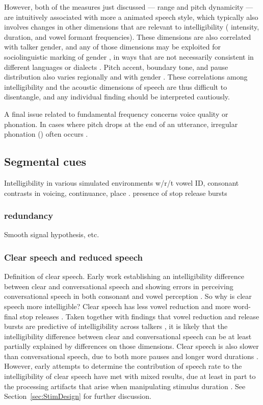 However, both of the measures just discussed — \fo{} range and pitch dynamicity — are intuitively associated with more a animated speech style, which typically also involves changes in other dimensions that are relevant to intelligibility (\viz{} intensity, duration, and vowel formant frequencies).  These dimensions are also correlated with talker gender, and any of those dimensions may be exploited for sociolinguistic marking of gender \citep[see, \eg][]{McconnellGinet1978}, in ways that are not necessarily consistent in different languages or dialects \citep[\eg][]{Yuasa2008}.  Pitch accent, boundary tone, and pause distribution also varies regionally and with gender \citep{ClopperSmiljanic2011}.  These correlations among intelligibility and the acoustic dimensions of speech are thus difficult to disentangle, and any individual finding should be interpreted cautiously.

A final issue related to fundamental frequency concerns voice quality or phonation.  In cases where pitch drops at the end of an utterance, irregular phonation () often occurs \citep[\eg][]{Kreiman1982}.  

\subsection{Segmental cues}
Intelligibility in various simulated environments w/r/t vowel ID, consonant contrasts in voicing, continuance, place \citep{CoxEtAl1987}.  
presence of stop release bursts \citep{PichenyEtAl1986, LiLoizou2008}

\subsubsection{redundancy}
Smooth signal hypothesis, etc.

\subsubsection{Clear speech and reduced speech}
Definition of clear speech.  
Early work establishing an intelligibility difference between clear and conversational speech and showing errors in perceiving conversational speech in both consonant and vowel perception \citep{PichenyEtAl1985}.  So why is clear speech more intelligible?  Clear speech has less vowel reduction and more word-final stop releases \citep{PichenyEtAl1986}.  Taken together with findings that vowel reduction and release bursts are predictive of intelligibility across talkers \citep{xxx,LiLoizou2008}, it is likely that the intelligibility difference between clear and conversational speech can be at least partially explained by differences on those dimensions.  Clear speech is also slower than conversational speech, due to both more pauses and longer word durations \citep{PichenyEtAl1986}.  However, early attempts to determine the contribution of speech rate to the intelligibility of clear speech have met with mixed results, due at least in part to the processing artifacts that arise when manipulating stimulus duration \citep{PichenyEtAl1989, UchanskiEtAl1996, LiuZeng2006}.  See Section~\ref{sec:StimDesign} for further discussion.


